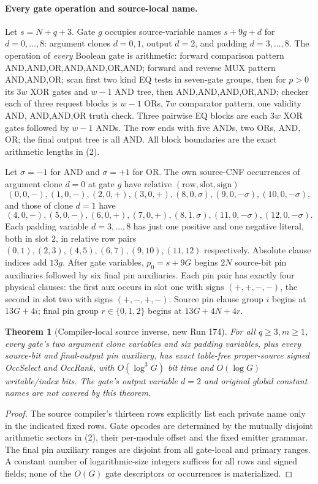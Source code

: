 \documentclass[11pt]{article}
\newtheorem{theorem}{Theorem}
\begin{document}
\paragraph{Every gate operation and source-local name.}
Let $s=N+q+3$. Gate $g$ occupies source-variable names
$s+9g+d$ for $d=0,\ldots,8$: argument clones $d=0,1$,
output $d=2$, and padding $d=3,\ldots,8$.
The operation of \emph{every} Boolean gate is arithmetic:
forward comparison pattern AND,AND,OR,AND,AND,OR,AND;
forward and reverse MUX pattern AND,AND,OR;
scan first two kind EQ tests in seven-gate groups,
then for $p>0$ its $3w$ XOR gates and $w-1$ AND tree,
then AND,AND,AND,OR,AND; checker each of three request
blocks is $w-1$ ORs, $7w$ comparator pattern, one
validity AND, AND,AND,OR truth check. Three pairwise
EQ blocks are each $3w$ XOR gates followed by $w-1$ ANDs.
The row ends with five ANDs, two ORs, AND, OR;
the final output tree is all AND. All block boundaries
are the exact arithmetic lengths in (2).

Let $\sigma=-1$ for AND and $\sigma=+1$ for OR.
The own source-CNF occurrences of argument clone $d=0$
at gate $g$ have relative $(\mathrm{row},\mathrm{slot},\mathrm{sign})$
\[
(0,0,-),(1,0,-),(2,0,+),(3,0,+),
(8,0,\sigma),(9,0,-\sigma),(10,0,-\sigma),
\]
and those of clone $d=1$ have
\[
(4,0,-),(5,0,-),(6,0,+),(7,0,+),
(8,1,\sigma),(11,0,-\sigma),(12,0,-\sigma).
\]
Each padding variable $d=3,\ldots,8$ has just one
positive and one negative literal, both in slot $2$,
in relative row pairs $(0,1),(2,3),(4,5),(6,7),
(9,10),(11,12)$ respectively.
Absolute clause indices add $13g$.
After gate variables, $p_0=s+9G$ begins $2N$
source-bit pin auxiliaries followed by six final pin
auxiliaries. Each pin pair has exactly four physical
clauses: the first aux occurs in slot one with signs
$(+,+,-,-)$, the second in slot two with signs
$(+,-,+,-)$. Source pin clause group $i$ begins at
$13G+4i$; final pin group $r\in\{0,1,2\}$ begins at
$13G+4N+4r$.

\begin{theorem}[Compiler-local source inverse, new Run 174]
For all $q\ge3,m\ge1$, every gate's two argument clone
variables and six padding variables, plus every
source-bit and final-output pin auxiliary, has exact
table-free proper-source signed OccSelect and OccRank,
with $O(\log^3G)$ bit time and $O(\log G)$ writable/index
bits. The gate's output variable $d=2$ and original
global constant names are \emph{not} covered by this theorem.
\end{theorem}
\begin{proof}
The source compiler's thirteen rows explicitly list each
private name only in the indicated fixed rows. Gate opcodes
are determined by the mutually disjoint arithmetic sectors
in (2), their per-module offset and the fixed emitter grammar.
The final pin auxiliary ranges are disjoint from all gate-local
and primary ranges. A constant number of logarithmic-size
integers suffices for all rows and signed fields; none of the
$O(G)$ gate descriptors or occurrences is materialized.
\end{proof}
\end{document}
